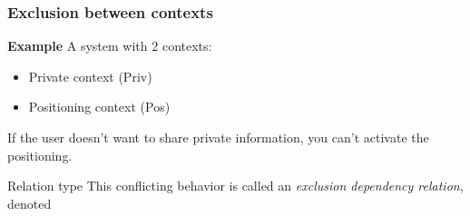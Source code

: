 \documentclass{beamer}
\begin{document}
\begin{frame}[noframenumbering]
	\frametitle{Exclusion between contexts}

	\textbf{Example} A system with 2 contexts:

	\begin{itemize}
		\item Private context (Priv)
		\item Positioning context (Pos)
	\end{itemize}

	If the user doesn't want to share private information, you can't activate
	the positioning.

	\begin{exampleblock}{Relation type}
		This conflicting behavior is called an \emph{exclusion dependency relation},
		denoted 
	\end{exampleblock}
\end{frame}
\end{document}
